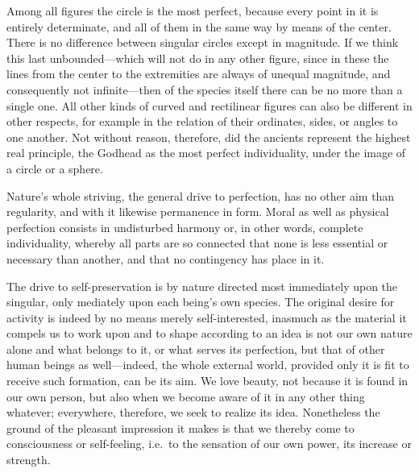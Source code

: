 \documentclass[12pt,a4paper]{article}
\begin{document}
Among all figures the circle is the most perfect, because every point in it is
entirely determinate, and all of them in the same way by means of the center.
There is no difference between singular circles except in magnitude. If we think
this last unbounded---which will not do in any other figure, since in these the
lines from the center to the extremities are always of unequal magnitude, and
consequently not infinite---then of the species itself there can be no more than
a single one. All other kinds of curved and rectilinear figures can also be
different in other respects, for example in the relation of their ordinates,
sides, or angles to one another.
Not without reason, therefore, did the ancients represent
the highest real principle, the Godhead as the most perfect individuality, under
the image of a circle or a sphere.

Nature's whole striving, the general drive to perfection, has no other aim than
regularity, and with it likewise permanence in form. Moral as well as physical
perfection consists in undisturbed harmony or, in other words, complete
individuality, whereby all parts are so connected that none is less essential or
necessary than another, and that no contingency has place in it.

The drive to self-preservation is by nature directed most immediately upon the
singular, only mediately upon each being's own species. The original desire for
activity is indeed by no means merely self-interested, inasmuch as the material
it compels us to work upon and to shape according to an idea is not our own
nature alone and what belongs to it, or what serves its perfection, but that of
other human beings as well---indeed, the whole external world, provided only it
is fit to receive such formation, can be its aim. We love beauty, not because it
is found in our own person, but also when we become aware of it in any other
thing whatever; everywhere, therefore, we seek to realize its idea. Nonetheless
the ground of the pleasant impression it makes is that we thereby come to
consciousness or self-feeling, i.e.\ to the sensation of our own power, its
increase or strength.
\end{document}
